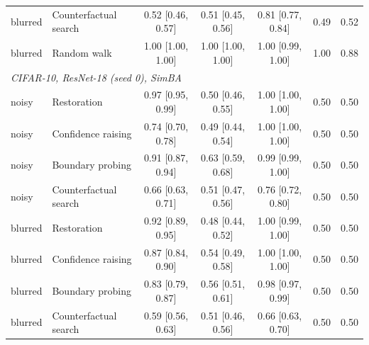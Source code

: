 \begin{landscape}
\begin{footnotesize}
\begin{longtable}{@{\extracolsep{\fill}}llccccc@{}}
\quad blurred & Counterfactual search & 0.52 {[}0.46, 0.57{]} & 0.51 {[}0.45, 0.56{]} & 0.81 {[}0.77, 0.84{]} & 0.49 & 0.52 \\
\quad blurred & Random walk & 1.00 {[}1.00, 1.00{]} & 1.00 {[}1.00, 1.00{]} & 1.00 {[}0.99, 1.00{]} & 1.00 & 0.88 \\
\multicolumn{7}{l}{\emph{CIFAR-10, ResNet-18 (seed 0), SimBA}} \\
\quad noisy & Restoration & 0.97 {[}0.95, 0.99{]} & 0.50 {[}0.46, 0.55{]} & 1.00 {[}1.00, 1.00{]} & 0.50 & 0.50 \\
\quad noisy & Confidence raising & 0.74 {[}0.70, 0.78{]} & 0.49 {[}0.44, 0.54{]} & 1.00 {[}1.00, 1.00{]} & 0.50 & 0.50 \\
\quad noisy & Boundary probing & 0.91 {[}0.87, 0.94{]} & 0.63 {[}0.59, 0.68{]} & 0.99 {[}0.99, 1.00{]} & 0.50 & 0.50 \\
\quad noisy & Counterfactual search & 0.66 {[}0.63, 0.71{]} & 0.51 {[}0.47, 0.56{]} & 0.76 {[}0.72, 0.80{]} & 0.50 & 0.50 \\
\quad blurred & Restoration & 0.92 {[}0.89, 0.95{]} & 0.48 {[}0.44, 0.52{]} & 1.00 {[}0.99, 1.00{]} & 0.50 & 0.50 \\
\quad blurred & Confidence raising & 0.87 {[}0.84, 0.90{]} & 0.54 {[}0.49, 0.58{]} & 1.00 {[}1.00, 1.00{]} & 0.50 & 0.50 \\
\quad blurred & Boundary probing & 0.83 {[}0.79, 0.87{]} & 0.56 {[}0.51, 0.61{]} & 0.98 {[}0.97, 0.99{]} & 0.50 & 0.50 \\
\quad blurred & Counterfactual search & 0.59 {[}0.56, 0.63{]} & 0.51 {[}0.46, 0.56{]} & 0.66 {[}0.63, 0.70{]} & 0.50 & 0.50 \\
\bottomrule
\end{longtable}
\end{footnotesize}
\end{landscape}

